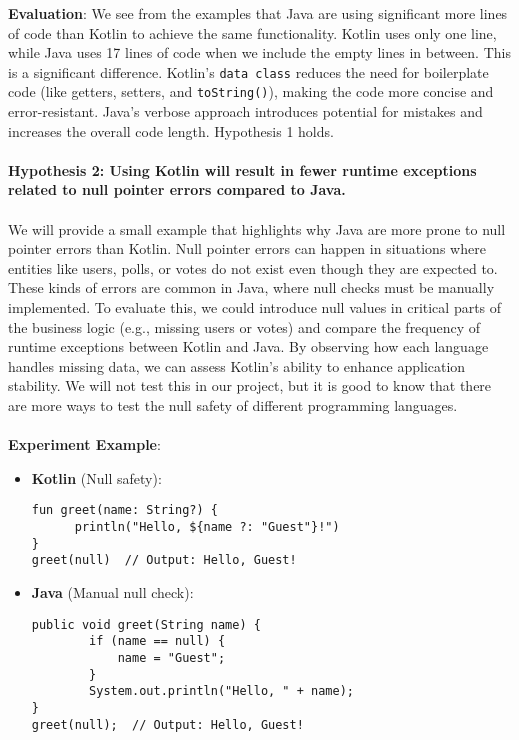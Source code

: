 \noindent \textbf{Evaluation}: We see from the examples that Java are using significant more lines of code than Kotlin to achieve the same functionality. Kotlin uses only one line, while Java uses 17 lines of code when we include the empty lines in between. This is a significant difference. Kotlin's \texttt{data class} reduces the need for boilerplate code (like getters, setters, and \texttt{toString()}), making the code more concise and error-resistant. Java’s verbose approach introduces potential for mistakes and increases the overall code length.  Hypothesis 1 holds. 
\\
\\
\textbf{Hypothesis 2: Using Kotlin will result in fewer runtime exceptions related to null pointer errors compared to Java.} 
\\
\\ 
We will provide a small example that highlights why Java are more prone to null pointer errors than Kotlin. Null pointer errors can happen in situations where entities like users, polls, or votes do not exist even though they are expected to. These kinds of errors are common in Java, where null checks must be manually implemented. To evaluate this, we could introduce null values in critical parts of the business logic (e.g., missing users or votes) and compare the frequency of runtime exceptions between Kotlin and Java. By observing how each language handles missing data, we can assess Kotlin’s ability to enhance application stability. We will not test this in our project, but it is good to know that there are more ways to test the null safety of different programming languages.
\\
\\
\textbf{Experiment Example}:

\begin{tcolorbox}[colframe=blue!80!black, colback=blue!5!white, coltitle=blue!50!black, title={-}, boxrule=0.5mm, width=0.8\textwidth, sharp corners=south]
    \begin{itemize}
    \vspace{0.2cm}
        \item \textbf{\scriptsize Kotlin} (\scriptsize Null safety):
        \begin{lstlisting}[style=kotlin, basicstyle=\scriptsize\ttfamily]
fun greet(name: String?) {
      println("Hello, ${name ?: "Guest"}!")
}
greet(null)  // Output: Hello, Guest!
        \end{lstlisting}
        
        \item \textbf{\scriptsize Java} (\scriptsize Manual null check):
        \begin{lstlisting}[style=java, basicstyle=\scriptsize\ttfamily]
public void greet(String name) {
        if (name == null) {
            name = "Guest";
        }
        System.out.println("Hello, " + name);
}
greet(null);  // Output: Hello, Guest!
        \end{lstlisting}
    \end{itemize}
\end{tcolorbox}

